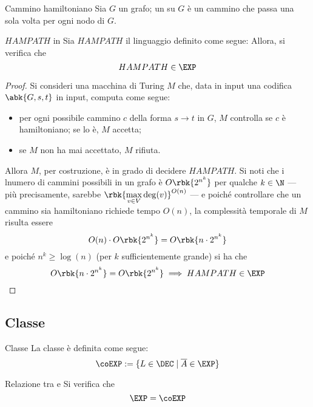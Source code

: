 \documentclass[a4paper, 12pt]{report}
\begin{document}
    \begin{frameddefn}{Cammino hamiltoniano}
        Sia $G$ un grafo; un  su $G$ è un cammino che passa una sola volta per ogni nodo di $G$.
    \end{frameddefn}

    \begin{framedthm}{$HAMPATH$ in \EXP}
        Sia $HAMPATH$ il linguaggio definito come segue:  Allora, si verifica che $$HAMPATH \in \EXP$$
    \end{framedthm}

    \begin{proof}
        Si consideri una macchina di Turing $M$ che, data in input una codifica $\abk{G, s, t}$ in input, computa come segue:

        \begin{itemize}
            \item per ogni possibile cammino $c$ della forma $s \to t$ in $G$, $M$ controlla se $c$ è hamiltoniano; se lo è, $M$ accetta;
            \item se $M$ non ha mai accettato, $M$ rifiuta.
        \end{itemize}

        Allora $M$, per costruzione, è in grado di decidere $HAMPATH$. Si noti che i lnumero di cammini possibili in un grafo è $O \rbk{2^{n^k}}$ per qualche $k \in \N$ --- più precisamente, sarebbe $\displaystyle \rbk{\max_{v \in V}{\deg(v)}}^{O(n)}$ --- e poiché controllare che un cammino sia hamiltoniano richiede tempo $O(n)$, la complessità temporale di $M$ risulta essere $$O(n) \cdot O\rbk{2^{n^k}} = O\rbk{n \cdot 2^{n^k}}$$ e poiché $n^k \ge \log(n)$ (per $k$ sufficientemente grande) si ha che $$O\rbk{n \cdot 2^{n^k}} = O\rbk{2^{n^k}} \implies HAMPATH \in \EXP$$
    \end{proof}

    \subsection{Classe \coEXP}

    \begin{frameddefn}{Classe \coEXP}
        La classe \coEXP è definita come segue: $$\coEXP := \{L \in \DEC \mid \overline A \in \EXP\}$$
    \end{frameddefn}

    \begin{framedthm}[label={exp = coexp}]{Relazione tra \EXP e \coEXP}
        Si verifica che $$\EXP = \coEXP$$
    \end{framedthm}
\end{document}
